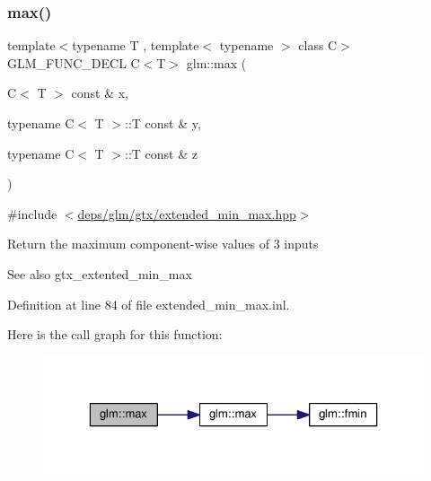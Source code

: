 \mbox{\label{group__gtx__extended__min__max_gae1b7bbe5c91de4924835ea3e14530744}} 
\subsubsection{\texorpdfstring{max()}{max()}\hspace{0.1cm}{\footnotesize\ttfamily [2/6]}}
{\footnotesize\ttfamily template$<$typename T , template$<$ typename $>$ class C$>$ \\
G\+L\+M\+\_\+\+F\+U\+N\+C\+\_\+\+D\+E\+CL C$<$T$>$ glm\+::max (\begin{DoxyParamCaption}\item[{C$<$ T $>$ const \&}]{x,  }\item[{typename C$<$ T $>$\+::T const \&}]{y,  }\item[{typename C$<$ T $>$\+::T const \&}]{z }\end{DoxyParamCaption})}



{\ttfamily \#include $<$\hyperlink{extended__min__max_8hpp}{deps/glm/gtx/extended\+\_\+min\+\_\+max.\+hpp}$>$}

Return the maximum component-\/wise values of 3 inputs \begin{DoxySeeAlso}{See also}
gtx\+\_\+extented\+\_\+min\+\_\+max 
\end{DoxySeeAlso}


Definition at line 84 of file extended\+\_\+min\+\_\+max.\+inl.

Here is the call graph for this function\+:
\nopagebreak
\begin{figure}[H]
\begin{center}
\leavevmode
\includegraphics[width=323pt]{df/d72/group__gtx__extended__min__max_gae1b7bbe5c91de4924835ea3e14530744_cgraph}
\end{center}
\end{figure}
\mbox{\label{group__gtx__extended__min__max_gaf832e9d4ab4826b2dda2fda25935a3a4}} 
